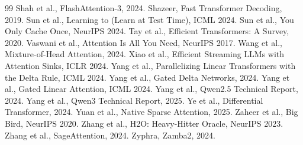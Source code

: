 \documentclass[11pt,a4paper]{article}
\begin{document}
\begin{thebibliography}{99}
 Shah et al., FlashAttention-3, 2024.
 Shazeer, Fast Transformer Decoding, 2019.
 Sun et al., Learning to (Learn at Test Time), ICML 2024.
 Sun et al., You Only Cache Once, NeurIPS 2024.
 Tay et al., Efficient Transformers: A Survey, 2020.
 Vaswani et al., Attention Is All You Need, NeurIPS 2017.
 Wang et al., Mixture-of-Head Attention, 2024.
 Xiao et al., Efficient Streaming LLMs with Attention Sinks, ICLR 2024.
 Yang et al., Parallelizing Linear Transformers with the Delta Rule, ICML 2024.
 Yang et al., Gated Delta Networks, 2024.
 Yang et al., Gated Linear Attention, ICML 2024.
 Yang et al., Qwen2.5 Technical Report, 2024.
 Yang et al., Qwen3 Technical Report, 2025.
 Ye et al., Differential Transformer, 2024.
 Yuan et al., Native Sparse Attention, 2025.
 Zaheer et al., Big Bird, NeurIPS 2020.
 Zhang et al., H2O: Heavy-Hitter Oracle, NeurIPS 2023.
 Zhang et al., SageAttention, 2024.
 Zyphra, Zamba2, 2024.
\end{thebibliography}
\end{document}

